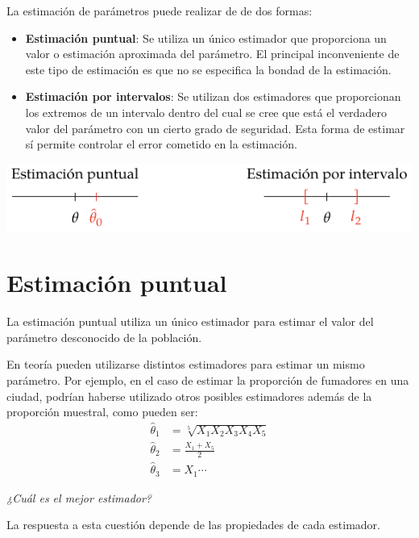 \documentclass[
  a4paper,
]{scrreport}
\providecommand{\tightlist}{%
  \setlength{\itemsep}{0pt}\setlength{\parskip}{0pt}}\usepackage{longtable,booktabs,array}
\theoremstyle{plain}
\theoremstyle{definition}
\theoremstyle{definition}
\theoremstyle{remark}
\begin{document}
La estimación de parámetros puede realizar de de dos formas:

\begin{itemize}
\tightlist
\item
  \textbf{Estimación puntual}: Se utiliza un único estimador que
  proporciona un valor o estimación aproximada del parámetro. El
  principal inconveniente de este tipo de estimación es que no se
  especifica la bondad de la estimación.
\item
  \textbf{Estimación por intervalos}: Se utilizan dos estimadores que
  proporcionan los extremos de un intervalo dentro del cual se cree que
  está el verdadero valor del parámetro con un cierto grado de
  seguridad. Esta forma de estimar sí permite controlar el error
  cometido en la estimación.
\end{itemize}

\begin{center}
\includegraphics[width=1\textwidth,height=\textheight]{img/estimacion/estimacion-puntual-intervalo.pdf}
\end{center}

\section{Estimación puntual}\label{estimaciuxf3n-puntual}

La estimación puntual utiliza un único estimador para estimar el valor
del parámetro desconocido de la población.

En teoría pueden utilizarse distintos estimadores para estimar un mismo
parámetro. Por ejemplo, en el caso de estimar la proporción de fumadores
en una ciudad, podrían haberse utilizado otros posibles estimadores
además de la proporción muestral, como pueden ser: \begin{align*}
\hat \theta_1 &= \sqrt[5]{X_1X_2X_3X_4X_5}\\
\hat \theta_2 &= \frac{X_1+X_5}{2}\\
\hat \theta_3 &= X_1 \cdots
\end{align*}

\emph{¿Cuál es el mejor estimador?}

La respuesta a esta cuestión depende de las propiedades de cada
estimador.
\end{document}
